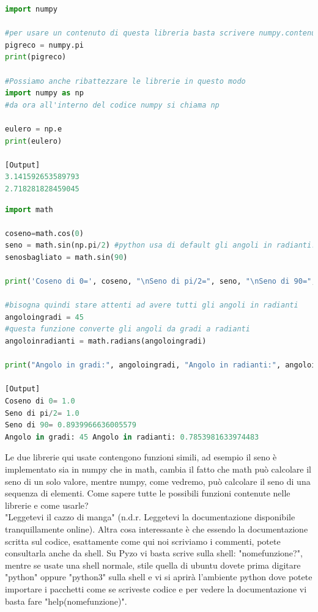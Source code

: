 \documentclass[10pt,a4paper]{article}
\begin{document}
\begin{lstlisting}[language=Python]
import numpy
 
#per usare un contenuto di questa libreria basta scrivere numpy.contenuto
pigreco = numpy.pi 
print(pigreco)

#Possiamo anche ribattezzare le librerie in questo modo
import numpy as np
#da ora all'interno del codice numpy si chiama np

eulero = np.e
print(eulero)

[Output]
3.141592653589793
2.718281828459045
\end{lstlisting}
\begin{lstlisting}[language=Python]
import math

coseno=math.cos(0)
seno = math.sin(np.pi/2) #python usa di default gli angoli in radianti!!!
senosbagliato = math.sin(90)

print('Coseno di 0=', coseno, "\nSeno di pi/2=", seno, "\nSeno di 90=", senosbagliato) 

#bisogna quindi stare attenti ad avere tutti gli angoli in radianti
angoloingradi = 45
#questa funzione converte gli angoli da gradi a radianti
angoloinradianti = math.radians(angoloingradi)

print("Angolo in gradi:", angoloingradi, "Angolo in radianti:", angoloinradianti)

[Output]
Coseno di 0= 1.0 
Seno di pi/2= 1.0 
Seno di 90= 0.8939966636005579
Angolo in gradi: 45 Angolo in radianti: 0.7853981633974483

\end{lstlisting}
Le due librerie qui usate contengono funzioni simili, ad esempio il seno è implementato sia in numpy che in math, cambia il fatto che math può calcolare il seno di un solo valore, mentre numpy, come vedremo, può calcolare il seno di una sequenza di elementi.
Come sapere tutte le possibili funzioni contenute nelle librerie e come usarle?\\
"Leggetevi il cazzo di manga" (n.d.r. Leggetevi la documentazione disponibile tranquillamente online). Altra cosa interessante è che essendo la documentazione scritta sul codice, esattamente come qui noi scriviamo i commenti, potete consultarla anche da shell. Su Pyzo vi basta scrive sulla shell: "nomefunzione?", mentre se usate una shell normale, stile quella di ubuntu dovete prima digitare "python" oppure "python3" sulla shell e vi si aprirà l'ambiente python dove potete importare i pacchetti come se scriveste codice e per vedere la documentazione vi basta fare "help(nomefunzione)".
\end{document}
